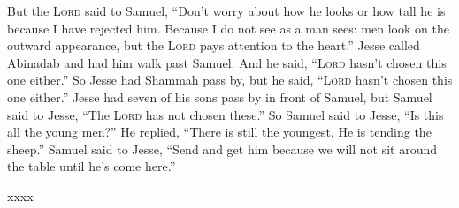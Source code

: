 \begin{inparaenum}
     But the \textsc{Lord} said to Samuel, ``Don't worry about how he looks or how tall he is because I have rejected him. Because I do not see as a man sees: men look on the outward appearance, but the \textsc{Lord} pays attention to the heart.''%
     Jesse called Abinadab and had him walk past Samuel. And he said, ``\textsc{Lord} hasn't chosen this one either.''%
     So Jesse had Shammah pass by, but he said, ``\textsc{Lord} hasn't chosen this one either.''%
     Jesse had seven of his sons pass by in front of Samuel, but Samuel said to Jesse, ``The \textsc{Lord} has not chosen these.''%
     So Samuel said to Jesse, ``Is this all the young men?'' He replied, ``There is still the youngest. He is tending the sheep.'' Samuel said to Jesse, ``Send and get him because we will not sit around the table until he's come here.''%
    
    xxxx%
    
    
\end{inparaenum}
